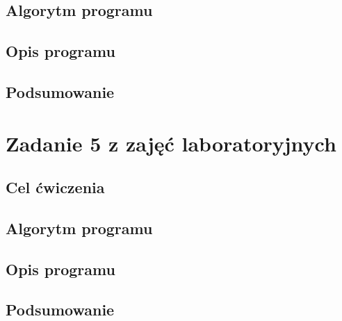 \documentclass{article} %
\newcommand{\forceindent}{\leavevmode{\parindent=1cm\indent}} %
\begin{document}
		\subsection{Algorytm programu}	
			\forceindent\lipsum[1-8][2-8]	
		\subsection{Opis programu}
			\forceindent\lipsum[3-8][2-8]	
		\subsection{Podsumowanie}
			\forceindent\lipsum[1-8][2-8]	
	\section{Zadanie 5 z zajęć laboratoryjnych}
		\subsection{Cel ćwiczenia}
			\forceindent\lipsum[1-8][2-8]
		
		\subsection{Algorytm programu}
			\forceindent\lipsum[1-8][2-8]		
		\subsection{Opis programu}
			\forceindent\lipsum[1-8][1-18]	
		\subsection{Podsumowanie}
			\forceindent\lipsum[1-8][2-8]			
	
\end{document}
